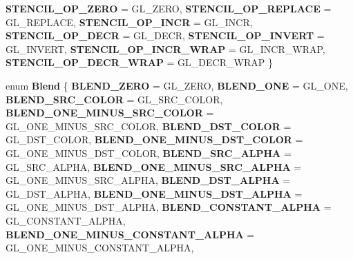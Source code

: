 \begin{DoxyCompactItemize}
{\bfseries S\+T\+E\+N\+C\+I\+L\+\_\+\+O\+P\+\_\+\+Z\+E\+RO} = G\+L\+\_\+\+Z\+E\+RO, 
{\bfseries S\+T\+E\+N\+C\+I\+L\+\_\+\+O\+P\+\_\+\+R\+E\+P\+L\+A\+CE} = G\+L\+\_\+\+R\+E\+P\+L\+A\+CE, 
{\bfseries S\+T\+E\+N\+C\+I\+L\+\_\+\+O\+P\+\_\+\+I\+N\+CR} = G\+L\+\_\+\+I\+N\+CR, 
\newline
{\bfseries S\+T\+E\+N\+C\+I\+L\+\_\+\+O\+P\+\_\+\+D\+E\+CR} = G\+L\+\_\+\+D\+E\+CR, 
{\bfseries S\+T\+E\+N\+C\+I\+L\+\_\+\+O\+P\+\_\+\+I\+N\+V\+E\+RT} = G\+L\+\_\+\+I\+N\+V\+E\+RT, 
{\bfseries S\+T\+E\+N\+C\+I\+L\+\_\+\+O\+P\+\_\+\+I\+N\+C\+R\+\_\+\+W\+R\+AP} = G\+L\+\_\+\+I\+N\+C\+R\+\_\+\+W\+R\+AP, 
{\bfseries S\+T\+E\+N\+C\+I\+L\+\_\+\+O\+P\+\_\+\+D\+E\+C\+R\+\_\+\+W\+R\+AP} = G\+L\+\_\+\+D\+E\+C\+R\+\_\+\+W\+R\+AP
 \}
\item 
\mbox{\label{classRenderState_a75b27b1725b8bd7053249ab7c9a4131f}} 
enum {\bfseries Blend} \{ \newline
{\bfseries B\+L\+E\+N\+D\+\_\+\+Z\+E\+RO} = G\+L\+\_\+\+Z\+E\+RO, 
{\bfseries B\+L\+E\+N\+D\+\_\+\+O\+NE} = G\+L\+\_\+\+O\+NE, 
{\bfseries B\+L\+E\+N\+D\+\_\+\+S\+R\+C\+\_\+\+C\+O\+L\+OR} = G\+L\+\_\+\+S\+R\+C\+\_\+\+C\+O\+L\+OR, 
{\bfseries B\+L\+E\+N\+D\+\_\+\+O\+N\+E\+\_\+\+M\+I\+N\+U\+S\+\_\+\+S\+R\+C\+\_\+\+C\+O\+L\+OR} = G\+L\+\_\+\+O\+N\+E\+\_\+\+M\+I\+N\+U\+S\+\_\+\+S\+R\+C\+\_\+\+C\+O\+L\+OR, 
\newline
{\bfseries B\+L\+E\+N\+D\+\_\+\+D\+S\+T\+\_\+\+C\+O\+L\+OR} = G\+L\+\_\+\+D\+S\+T\+\_\+\+C\+O\+L\+OR, 
{\bfseries B\+L\+E\+N\+D\+\_\+\+O\+N\+E\+\_\+\+M\+I\+N\+U\+S\+\_\+\+D\+S\+T\+\_\+\+C\+O\+L\+OR} = G\+L\+\_\+\+O\+N\+E\+\_\+\+M\+I\+N\+U\+S\+\_\+\+D\+S\+T\+\_\+\+C\+O\+L\+OR, 
{\bfseries B\+L\+E\+N\+D\+\_\+\+S\+R\+C\+\_\+\+A\+L\+P\+HA} = G\+L\+\_\+\+S\+R\+C\+\_\+\+A\+L\+P\+HA, 
{\bfseries B\+L\+E\+N\+D\+\_\+\+O\+N\+E\+\_\+\+M\+I\+N\+U\+S\+\_\+\+S\+R\+C\+\_\+\+A\+L\+P\+HA} = G\+L\+\_\+\+O\+N\+E\+\_\+\+M\+I\+N\+U\+S\+\_\+\+S\+R\+C\+\_\+\+A\+L\+P\+HA, 
\newline
{\bfseries B\+L\+E\+N\+D\+\_\+\+D\+S\+T\+\_\+\+A\+L\+P\+HA} = G\+L\+\_\+\+D\+S\+T\+\_\+\+A\+L\+P\+HA, 
{\bfseries B\+L\+E\+N\+D\+\_\+\+O\+N\+E\+\_\+\+M\+I\+N\+U\+S\+\_\+\+D\+S\+T\+\_\+\+A\+L\+P\+HA} = G\+L\+\_\+\+O\+N\+E\+\_\+\+M\+I\+N\+U\+S\+\_\+\+D\+S\+T\+\_\+\+A\+L\+P\+HA, 
{\bfseries B\+L\+E\+N\+D\+\_\+\+C\+O\+N\+S\+T\+A\+N\+T\+\_\+\+A\+L\+P\+HA} = G\+L\+\_\+\+C\+O\+N\+S\+T\+A\+N\+T\+\_\+\+A\+L\+P\+HA, 
{\bfseries B\+L\+E\+N\+D\+\_\+\+O\+N\+E\+\_\+\+M\+I\+N\+U\+S\+\_\+\+C\+O\+N\+S\+T\+A\+N\+T\+\_\+\+A\+L\+P\+HA} = G\+L\+\_\+\+O\+N\+E\+\_\+\+M\+I\+N\+U\+S\+\_\+\+C\+O\+N\+S\+T\+A\+N\+T\+\_\+\+A\+L\+P\+HA, 

\end{DoxyCompactItemize}
